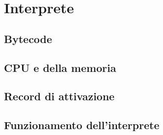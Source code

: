 \documentclass[../main.tex]{subfiles}
\begin{document}
\chapter{Interprete}\label{c:interprete}
\section{Bytecode}\label{s:bytecode}

\section{CPU e della memoria}\label{s:cpu-e-memoria}

\section{Record di attivazione}\label{s:record-di-attivazione}

\section{Funzionamento dell'interprete}\label{s:funzionamento-interprete}
\end{document}
